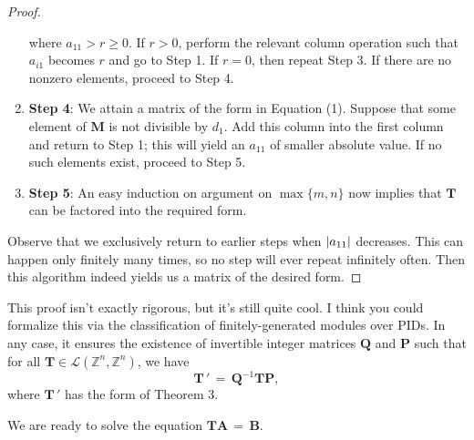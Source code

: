 \documentclass[11pt]{article}
\renewcommand{\vec}[1]{\mathbf{#1}}
\newcommand{\mat}[1]{\mathbf{#1}}
\begin{document}
\begin{adjustwidth}{0.5cm}{}
\begin{proof}
\begin{enumerate}
\[      \]
      where $a_{11} > r \ge 0$. If $r > 0$, perform the relevant column operation such that $a_{i1}$ becomes $r$ and go to Step 1. If $r = 0$, then repeat Step 3. If there are no nonzero elements, proceed to Step 4.
      \item \textbf{Step 4}: We attain a matrix of the form in Equation (1). Suppose that some element of $\mat{M}$ is not divisible by $d_{1}$. Add this column into the first column and return to Step 1; this will yield an $a_{11}$ of smaller absolute value. If no such elements exist, proceed to Step 5.
      \item \textbf{Step 5}: An easy induction on argument on $\max \{ m, n \}$ now implies that $\mat{T}$ can be factored into the required form.
    \end{enumerate}
    Observe that we exclusively return to earlier steps when $\abs{a_{11}}$ decreases. This can happen only finitely many times, so no step will ever repeat infinitely often. Then this algorithm indeed yields us a matrix of the desired form.
  \end{proof}
\end{adjustwidth}

This proof isn't exactly rigorous, but it's still quite cool. I think you could formalize this via the classification of finitely-generated modules over PIDs. In any case, it ensures the existence of invertible integer matrices $\mat{Q}$ and $\mat{P}$ such that for all $\mat{T} \in \mathcal{L}(\mathbb{Z}^{n}, \mathbb{Z}^{n})$, we have
\[
  \mat{T} \, ' \, = \, \mat{Q}^{-1}\mat{T}\mat{P},
\]
where $\mat{T} \, '$ has the form of Theorem 3.

\newpage

We are ready to solve the equation $\mat{T} \vec{A} \, = \, \vec{B}$.
\end{document}
